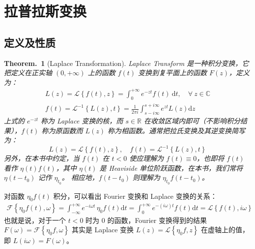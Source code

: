 \documentclass[UTF8]{report}
\def\R{\mathbb{R}}
\def\C{\mathbb{C}}
\theoremstyle{MyLineTheoremStyle} %
\theoremstyle{MyBlockTheoremStyle} %
\newtheorem{BlockTheorem}[LineTheorem]{Theorem.\,} %
\theoremstyle{MySubsubsectionStyle} %
\begin{document}
\section{拉普拉斯变换}

\subsection{定义及性质}

\begin{BlockTheorem}[Laplace Transformation]\label{Laplace Transformation}
    Laplace Transform 是一种积分变换，它把定义在正实轴 $(0, +\infty)$ 上的函数 $f(t)$ 变换到复平面上的函数 $F(z)$，定义为：
    \begin{gather}
        L(z) = \mathscr{L}\left\{ f(t), z \right\} = \int_{0}^{+\infty}e^{-zt} f(t) \ \mathrm{d}t,\quad \forall\ z \in \C \\ 
        f(t) = \mathscr{L}^{-1}\left\{ L(z), t \right\} = 
        \frac{1}{2 \pi i} \int_{s - i\infty}^{s + i\infty}  e^{zt} L(z)\mathrm{d}z
    \end{gather}
    上式的 $e^{-zt}$ 称为 Laplace 变换的核，而 $s \in \R$ 在收敛区域内即可（不影响积分结果），$f(t)$ 称为原函数而 $L(z)$ 称为相函数。通常把拉氏变换及其逆变换简写为：
    \begin{equation}
        L(z) = \mathscr{L}\left\{ f(t), z \right\} ,\quad f(t) = \mathscr{L}^{-1}\left\{ L(z), t \right\}
    \end{equation} 
    另外，在本书中约定，当 $f(t)$ 在 $t < 0$ 使应理解为 $f(t) \equiv 0$，也即将 $f(t)$ 看作 $\eta(t) f(t)$，其中 $\eta(t)$ 是 Heaviside 单位阶跃函数，在本书，我们常将 $\eta(t - t_0)$ 记作 $\eta_{t_0}$。
    相应地，$f(t - t_0)$ 则理解为 $\eta_{t_0} f(t - t_0)$。
\end{BlockTheorem}


对函数 $\eta_0 f(t)$ 积分，可以看出 Fourier 变换和 Laplace 变换的关系：
\begin{gather}
\mathscr{F}\left\{ \eta_0f(t), \omega \right\} 
= \int_{-\infty}^{+\infty} e^{-i \omega t}\, \eta_0f(t) \mathrm{d}t 
= \int_{0}^{+\infty} e^{-(i \omega) t} f(t) \mathrm{d}t 
= \mathscr{L}\left\{ f(t), i\omega \right\}
\end{gather}
也就是说，对于一个 $t <0$ 时为 0 的函数，Fourier 变换得到的结果 $F(\omega) = \mathscr{F}\left\{ \eta_0 f, \omega \right\}$ 其实是 Laplace 变换 $L(z) = \mathscr{L}\left\{ \eta_0 f, z \right\}$ 在虚轴上的值，即 $L(i \omega) = F(\omega)$。
\end{document}
